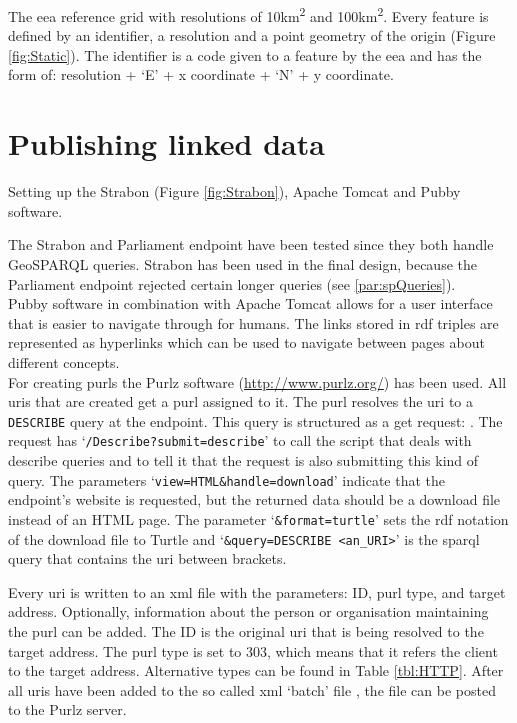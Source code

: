 The \ac{eea} reference grid with resolutions of 10km\textsuperscript{2} and 100km\textsuperscript{2}. Every feature is defined by an identifier, a resolution and a point geometry of the origin (Figure \ref{fig:Static}). The identifier is a code given to a feature by the \ac{eea} and has the form of: resolution + `E' + x coordinate + `N' + y coordinate.   

\section{Publishing linked data}
\label{par:publishLD}
Setting up the Strabon (Figure \ref{fig:Strabon}), Apache Tomcat and Pubby software. 

The Strabon and Parliament endpoint have been tested since they both handle GeoSPARQL queries. Strabon has been used in the final design, because the Parliament endpoint rejected certain longer queries (see \ref{par:spQueries}). \\

Pubby software in combination with Apache Tomcat allows for a user interface that is easier to navigate through for humans. The links stored in \ac{rdf} triples are represented as hyperlinks which can be used to navigate between pages about different concepts. \\

For creating \aclp{purl} the Purlz software (\url{http://www.purlz.org/}) has been used. All \acp{uri} that are created get a \ac{purl} assigned to it. The \ac{purl} resolves the \ac{uri} to a \texttt{DESCRIBE} query at the endpoint. This query is structured as a get request: \texttt{}. The request has `\texttt{/Describe?submit=describe}' to call the script that deals with describe queries and to tell it that the request is also submitting this kind of query. The parameters `\texttt{view=HTML\&handle=download}' indicate that the endpoint's website is requested, but the returned data should be a download file instead of an HTML page. The parameter `\texttt{\&format=turtle}' sets the \ac{rdf} notation of the download file to Turtle and `\texttt{\&query=DESCRIBE <an\_URI>}' is the \ac{sparql} query that contains the \ac{uri} between brackets. 

Every \ac{uri} is written to an \ac{xml} file with the parameters: ID, \ac{purl} type, and target address. Optionally, information about the person or organisation maintaining the \ac{purl} can be added. The ID is the original \ac{uri} that is being resolved to the target address. The \ac{purl} type is set to 303, which means that it refers the client to the target address. Alternative types can be found in Table \ref{tbl:HTTP}. After all \acp{uri} have been added to the so called \ac{xml} `batch' file \citep{LD:PURL2}, the file can be posted to the Purlz server. \\

